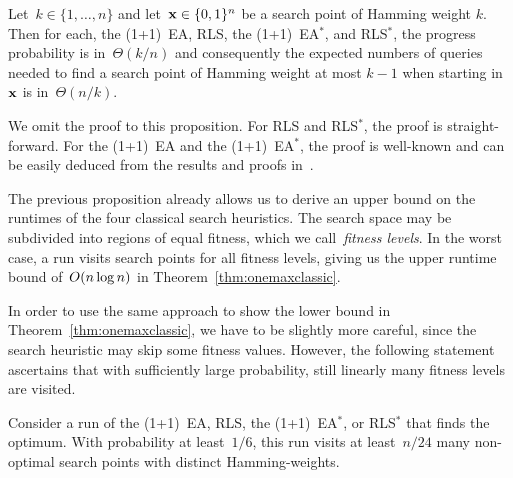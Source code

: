 \documentclass[a4paper,11pt]{article}
\begin{document}
\begin{proposition}
\label{prop:onemaxprogress}
Let~$k\in\{1,\dots,n\}$ and let~$\xvec\in\{0,1\}^n$ be a search point of Hamming weight $k$. Then for each, the (1+1)~EA, RLS, the (1+1)~EA$^*$, and RLS$^*$, the progress probability is in~$\Theta(k/n)$ and consequently the expected numbers of queries needed to find a search point of Hamming weight at most {$k-1$} when starting in~$\xvec$ is in~$\Theta(n/k)$.
\end{proposition}

We omit the proof to this proposition. For RLS and RLS$^*$, the proof is straight-forward. For the (1+1)~EA and the (1+1)~EA$^*$, the proof is well-known and can be easily deduced from the results and proofs in~\cite{djwea02}.

The previous proposition already allows us to derive an upper bound on the runtimes of the four classical search heuristics. The search space may be subdivided into regions of equal fitness, which we call~\emph{fitness levels}. In the worst case, a run visits search points for all fitness levels, giving us the upper runtime bound of~${O}(n\log n)$ in Theorem~\ref{thm:onemaxclassic}.

In order to use the same approach to show the lower bound in Theorem~\ref{thm:onemaxclassic}, we have to be slightly more careful, since the search heuristic may skip some fitness values. However, the following statement ascertains that with sufficiently large probability, still linearly many fitness levels are visited.

\begin{proposition}
\label{prop:onemaxmanypoints}
Consider a run of the (1+1)~EA, RLS, the (1+1)~EA$^*$, or RLS$^*$ that finds the optimum. With probability at least~$1/6$, this run visits at least~$n/24$ many non-optimal search points with distinct Hamming-weights.
\end{proposition}
\end{document}
